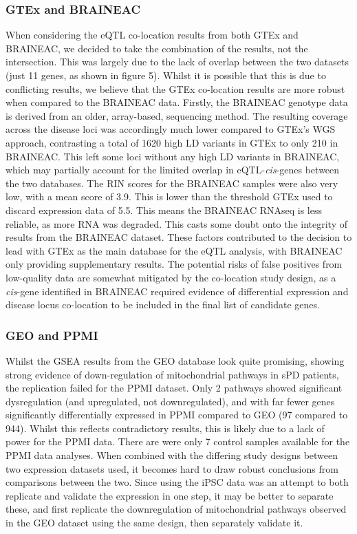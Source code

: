 \documentclass{article}
\begin{document}
\subsubsection{GTEx and BRAINEAC}
When considering the eQTL co-location results from both GTEx and BRAINEAC, we decided to take the combination of the results, not the intersection. This was largely due to the lack of overlap between the two datasets (just 11 genes, as shown in figure 5). Whilst it is possible that this is due to conflicting results, we believe that the GTEx co-location results are more robust when compared to the BRAINEAC data. Firstly, the BRAINEAC genotype data is derived from an older, array-based, sequencing method. The resulting coverage across the disease loci was accordingly much lower compared to GTEx's WGS approach, contrasting a total of 1620 high LD variants in GTEx to only 210 in BRAINEAC. This left some loci without any high LD variants in BRAINEAC, which may partially account for the limited overlap in eQTL-\textit{cis}-genes between the two databases. The RIN scores for the BRAINEAC samples were also very low, with a mean score of 3.9. This is lower than the threshold GTEx used to discard expression data of 5.5\cite{Aguet2020TheTissues}. This means the BRAINEAC RNAseq is less reliable, as more RNA was degraded. This casts some doubt onto the integrity of results from the BRAINEAC dataset. These factors contributed to the decision to lead with GTEx as the main database for the eQTL analysis, with BRAINEAC only providing supplementary results. The potential risks of false positives from low-quality data are somewhat mitigated by the co-location study design, as a \textit{cis}-gene identified in BRAINEAC required evidence of differential expression and disease locus co-location to be included in the final list of candidate genes.
\subsubsection{GEO and PPMI}
\label{subsubsec:GEOandPPMI}
Whilst the GSEA results from the GEO database look quite promising, showing strong evidence of down-regulation of mitochondrial pathways in sPD patients, the replication failed for the PPMI dataset. Only 2 pathways showed significant dysregulation (and upregulated, not downregulated), and with far fewer genes significantly differentially expressed in PPMI compared to GEO (97 compared to 944). Whilst this reflects contradictory results, this is likely due to a lack of power for the PPMI data. There are were only 7 control samples available for the PPMI data analyses. When combined with the differing study designs between two expression datasets used, it becomes hard to draw robust conclusions from comparisons between the two. Since using the iPSC data was an attempt to both replicate and validate the expression in one step, it may be better to separate these, and first replicate the downregulation of mitochondrial pathways observed in the GEO dataset using the same design, then separately validate it.
\end{document}

